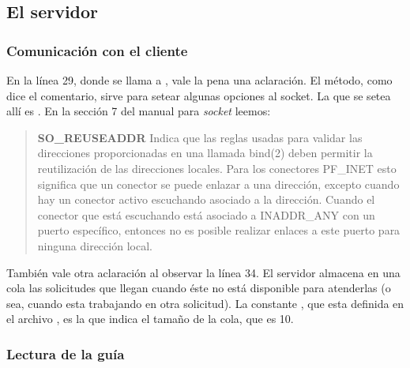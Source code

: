 \subsection{El servidor}


\subsubsection{Comunicación con el cliente}

En la línea 29, donde se llama a , vale la pena una
aclaración. El método, como dice el comentario, sirve para setear algunas
opciones al socket. La que se setea allí es . En la
sección 7 del manual para \emph{socket} leemos:

\begin{quote}

\textbf{SO\_REUSEADDR}\linebreak
Indica que las reglas usadas para validar las direcciones proporcionadas en una
llamada bind(2) deben permitir la reutilización  de  las direcciones  locales.
Para  los conectores PF\_INET esto significa que un conector se puede enlazar a
una dirección, excepto cuando hay un conector activo escuchando asociado a la
dirección. Cuando el conector que está escuchando está asociado a INADDR\_ANY
con un puerto específico, entonces no es posible realizar enlaces a este puerto
para ninguna dirección local.

\end{quote}

También vale otra aclaración al observar la línea 34. El servidor almacena en
una cola las solicitudes que llegan cuando éste no está disponible para
atenderlas (o sea, cuando esta trabajando en otra solicitud). La constante
, que esta definida en el archivo , es la
que indica el tamaño de la cola, que es 10.

\subsubsection{Lectura de la guía}

